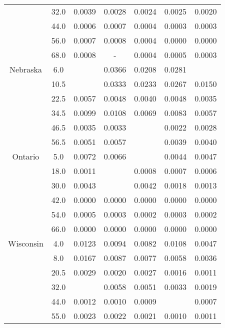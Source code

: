 \documentclass{article}
\begin{document}
\begin{table}[H]
{\begin{tabular}{@{}ccccccc@{}}
          & 32.0                & 0.0039 & 0.0028 & 0.0024 & 0.0025 & 0.0020 \\
          & 44.0                & 0.0006 & 0.0007 & 0.0004 & 0.0003 & 0.0003 \\
          & 56.0                & 0.0007 & 0.0008 & 0.0004 & 0.0000 & 0.0000 \\
          & 68.0                & 0.0008 & -      & 0.0004 & 0.0005 & 0.0003 \\
Nebraska  & 6.0                 &        & 0.0366 & 0.0208 & 0.0281 &        \\
          & 10.5                &        & 0.0333 & 0.0233 & 0.0267 & 0.0150 \\
          & 22.5                & 0.0057 & 0.0048 & 0.0040 & 0.0048 & 0.0035 \\
          & 34.5                & 0.0099 & 0.0108 & 0.0069 & 0.0083 & 0.0057 \\
          & 46.5                & 0.0035 & 0.0033 &        & 0.0022 & 0.0028 \\
          & 56.5                & 0.0051 & 0.0057 &        & 0.0039 & 0.0040 \\
Ontario   & 5.0                 & 0.0072 & 0.0066 &        & 0.0044 & 0.0047 \\
          & 18.0                & 0.0011 &        & 0.0008 & 0.0007 & 0.0006 \\
          & 30.0                & 0.0043 &        & 0.0042 & 0.0018 & 0.0013 \\
          & 42.0                & 0.0000 & 0.0000 & 0.0000 & 0.0000 & 0.0000 \\
          & 54.0                & 0.0005 & 0.0003 & 0.0002 & 0.0003 & 0.0002 \\
          & 66.0                & 0.0000 & 0.0000 & 0.0000 & 0.0000 & 0.0000 \\
Wisconsin & 4.0                 & 0.0123 & 0.0094 & 0.0082 & 0.0108 & 0.0047 \\
          & 8.0                 & 0.0167 & 0.0087 & 0.0077 & 0.0058 & 0.0036 \\
          & 20.5                & 0.0029 & 0.0020 & 0.0027 & 0.0016 & 0.0011 \\
          & 32.0                &        & 0.0058 & 0.0051 & 0.0033 & 0.0019 \\
          & 44.0                & 0.0012 & 0.0010 & 0.0009 &        & 0.0007 \\
          & 55.0                & 0.0023 & 0.0022 & 0.0021 & 0.0010 & 0.0011 \\ \bottomrule
\end{tabular}%
}
\end{table}
\end{document}

